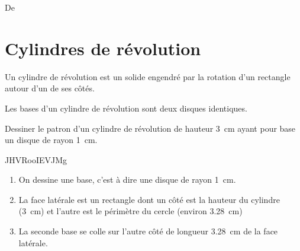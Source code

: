 
De \cite{NRHooXFvgpp5}


\section{Cylindres de révolution}

\begin{definition}
Un cylindre de révolution est un solide engendré par la rotation d'un rectangle autour d'un de ses côtés.
\end{definition}

\begin{propriete}
   Les bases d'un cylindre de révolution sont deux disques identiques.
\end{propriete}


\begin{example}
    Dessiner le patron d'un cylindre de révolution de hauteur \SI{3}{\centi\meter} ayant pour base un disque de rayon \SI{1}{\centi\meter}.

JHVRooIEVJMg



\begin{center}
   
\end{center}
\begin{center}
   
\end{center}
\begin{center}
   
\end{center}



    \begin{enumerate}
        \item
            On dessine une base, c'est à dire une disque de rayon \SI{1}{\centi\meter}.
        \item
            La face latérale est un rectangle dont un côté est la hauteur du cylindre (\SI{3}{\centi\meter}) et l'autre est le périmètre du cercle (environ \SI{3.28}{\centi\meter})
        \item
            La seconde base se colle sur l'autre côté de longueur \SI{3.28}{\centi\meter} de la face latérale.
    \end{enumerate}
\end{example}
